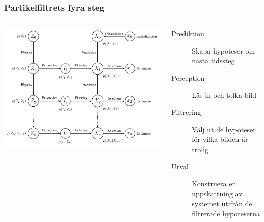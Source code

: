 \documentclass[]{beamer}
\renewcommand{\ae}{\"{a}}
\renewcommand{\oe}{\"{o}}
\begin{document}
\begin{frame}
  \frametitle{Partikelfiltrets fyra steg}
  \begin{columns}[tt]
    \column{2.5in}
    \includegraphics[width=1\textwidth]{hmm-graph-pf.pdf}

    \column{2.5in}
    \begin{description}
    \item[Prediktion] Skapa hypoteser om n\ae sta tidssteg
    \item[Perception] L\ae s in och tolka bild
    \item[Filtrering] V\ae lj ut de hypoteser f\oe r vilka bilden \ae r trolig
    \item[Urval] Konstruera en uppskattning av systemet utifr\aa n de filtrerade hypoteserna
    \end{description}
    
  \end{columns}
\end{frame}

\newcommand{\Circle}[1]{
  \begin{picture}(0, 0)
    \color{#1}
    \put(-16, 4){\circle{16}}
  \end{picture}
}
\newcommand{\Line}[1]{
  \begin{picture}(0, 0)
    \color{#1}
    \put(-24, 4){\line(1,0){16}}
  \end{picture}
}
\end{document}
